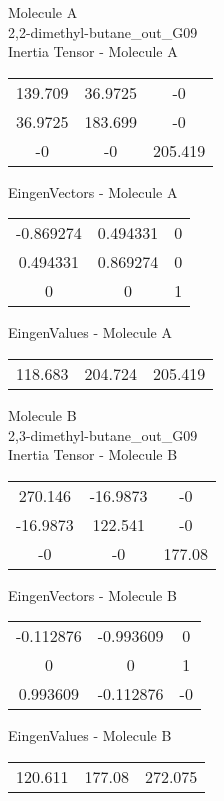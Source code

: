 \begin{multicols}{2}
\begin{center}
Molecule A \\ 
2,2-dimethyl-butane\_out\_G09
\\
Inertia Tensor - Molecule A \\
\vtab
\begin{tabular}{|c c c|}
139.709	 & 	36.9725	 & 	-0	 \\
36.9725	 & 	183.699	 & 	-0	 \\
-0	 & 	-0	 & 	205.419
\end{tabular}

\vtab
 EingenVectors - Molecule A     \\
\vtab
\begin{tabular}{|c c c|}
-0.869274	 & 	0.494331	 & 	0	 \\
0.494331	 & 	0.869274	 & 	0	 \\
0	 & 	0	 & 	1
\end{tabular}

\vtab
 EingenValues - Molecule A     \\
\vtab
\begin{tabular}{|c c c|}
118.683	 & 	204.724	 & 	205.419
\end{tabular}
\columnbreak

Molecule B \\ 
2,3-dimethyl-butane\_out\_G09
\\
Inertia Tensor - Molecule B \\
\vtab
\begin{tabular}{|c c c|}
270.146	 & 	-16.9873	 & 	-0	 \\
-16.9873	 & 	122.541	 & 	-0	 \\
-0	 & 	-0	 & 	177.08
\end{tabular}

\vtab
 EingenVectors - Molecule B     \\
\vtab
\begin{tabular}{|c c c|}
-0.112876	 & 	-0.993609	 & 	0	 \\
0	 & 	0	 & 	1	 \\
0.993609	 & 	-0.112876	 & 	-0
\end{tabular}

\vtab
 EingenValues - Molecule B     \\
\vtab
\begin{tabular}{|c c c|}
120.611	 & 	177.08	 & 	272.075
\end{tabular}

\end{center}
\end{multicols}
